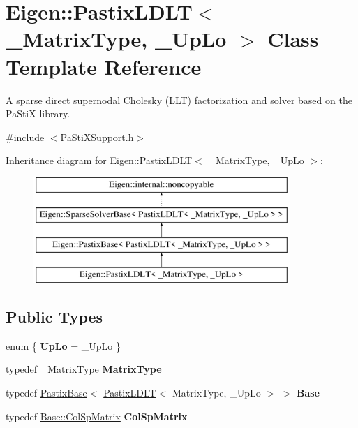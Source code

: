 \hypertarget{class_eigen_1_1_pastix_l_d_l_t}{}\section{Eigen\+::Pastix\+L\+D\+LT$<$ \+\_\+\+Matrix\+Type, \+\_\+\+Up\+Lo $>$ Class Template Reference}
\label{class_eigen_1_1_pastix_l_d_l_t}


A sparse direct supernodal Cholesky (\mbox{\hyperlink{class_eigen_1_1_l_l_t}{L\+LT}}) factorization and solver based on the Pa\+StiX library.  




{\ttfamily \#include $<$Pa\+Sti\+X\+Support.\+h$>$}

Inheritance diagram for Eigen\+::Pastix\+L\+D\+LT$<$ \+\_\+\+Matrix\+Type, \+\_\+\+Up\+Lo $>$\+:\begin{figure}[H]
\begin{center}
\leavevmode
\includegraphics[height=4.000000cm]{class_eigen_1_1_pastix_l_d_l_t}
\end{center}
\end{figure}
\subsection*{Public Types}
\begin{DoxyCompactItemize}
\item 
\mbox{\label{class_eigen_1_1_pastix_l_d_l_t_ad023cac350f23169d8e97ab5fcb6ea3a}} 
enum \{ {\bfseries Up\+Lo} = \+\_\+\+Up\+Lo
 \}
\item 
\mbox{\label{class_eigen_1_1_pastix_l_d_l_t_ae0a5d38599cff2864016bddbc197b618}} 
typedef \+\_\+\+Matrix\+Type {\bfseries Matrix\+Type}
\item 
\mbox{\label{class_eigen_1_1_pastix_l_d_l_t_a74bfb839262fdaee389e9ef974ab6b64}} 
typedef \mbox{\hyperlink{class_eigen_1_1_pastix_base}{Pastix\+Base}}$<$ \mbox{\hyperlink{class_eigen_1_1_pastix_l_d_l_t}{Pastix\+L\+D\+LT}}$<$ Matrix\+Type, \+\_\+\+Up\+Lo $>$ $>$ {\bfseries Base}
\item 
\mbox{\label{class_eigen_1_1_pastix_l_d_l_t_a259cd5dc41031a40441575cde21e6528}} 
typedef \mbox{\hyperlink{class_eigen_1_1_sparse_matrix}{Base\+::\+Col\+Sp\+Matrix}} {\bfseries Col\+Sp\+Matrix}
\end{DoxyCompactItemize}
